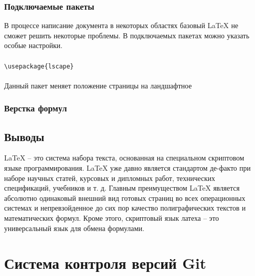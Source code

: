 \documentclass[12pt,a4paper]{article}
\begin{document}
\subsubsection{Подключаемые пакеты}
В процессе написание документа в некоторых областях базовый \LaTeX{} не сможет решить некоторые проблемы. В подключаемых пакетах можно указать особые настройки.
\\\\
\verb+\usepackage{lscape}+
\\\\
Данный пакет меняет положение страницы на ландшафтное

\subsubsection{Верстка формул}
\subsection{Выводы}
\LaTeX{} – это система набора текста, основанная на специальном скриптовом языке программирования. \LaTeX{} уже давно является стандартом де-факто при наборе научных статей, курсовых и дипломных работ, технических спецификаций, учебников и т. д. Главным преимуществом \LaTeX{} является абсолютно одинаковый внешний вид готовых страниц во всех операционных системах и непревзойденное до сих пор качество полиграфических текстов и математических формул. Кроме этого, скриптовый язык латеха – это универсальный язык для обмена формулами.

\newpage
\section{Система контроля версий Git}
\end{document}
